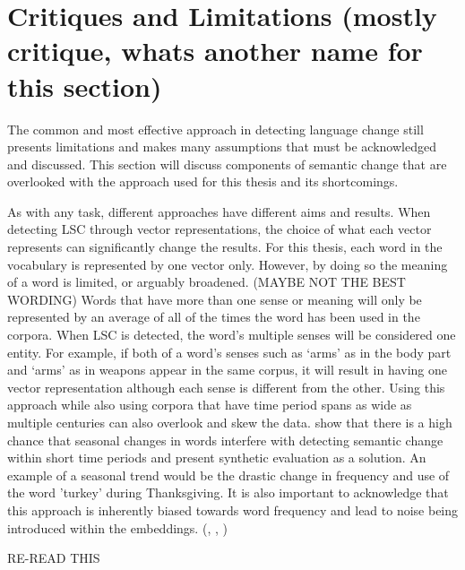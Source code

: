 \section{Critiques and Limitations (mostly critique, whats another name for this section)}
\label{sec:critiques}

The common and most effective approach in detecting language change still presents limitations and makes many assumptions that must be acknowledged and discussed. This section will discuss components of semantic change that are overlooked with the approach used for this thesis and its shortcomings. 

As with any task, different approaches have different aims and results. When detecting LSC through vector representations, the choice of what each vector represents can significantly change the results. For this thesis, each word in the vocabulary is represented by one vector only. However, by doing so the meaning of a word is limited, or arguably broadened. (MAYBE NOT THE BEST WORDING) Words that have more than one sense or meaning will only be represented by an average of all of the times the word has been used in the corpora. When LSC is detected, the word’s multiple senses will be considered one entity. For example, if both of a word’s senses such as ‘arms’ as in the body part and ‘arms’ as in weapons appear in the same corpus, it will result in having one vector representation although each sense is different from the other. Using this approach while also using corpora that have time period spans as wide as multiple centuries can also overlook and skew the data. \citet{shoemark-etal-2019-room} show that there is a high chance that seasonal changes in words interfere with detecting semantic change within short time periods and present synthetic evaluation as a solution. An example of a seasonal trend would be the drastic change in frequency and use of the word 'turkey' during Thanksgiving. It is also important to acknowledge that this approach is inherently biased towards word frequency and lead to noise being introduced within the embeddings. (\citet{dubossarsky-etal-2017-outta}, \citet{kaiser-etal-2020-ims}, \citet{schlechtweg-etal-2020-semeval})


RE-READ THIS

